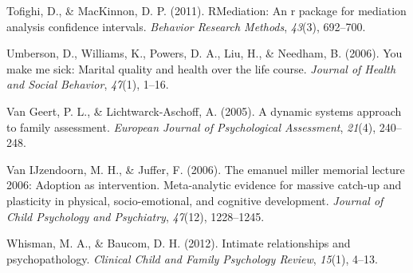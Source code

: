 \documentclass[man]{apa6}
\begin{document}
\leavevmode\hypertarget{ref-monte}{}%
Tofighi, D., \& MacKinnon, D. P. (2011). RMediation: An r package for mediation analysis confidence intervals. \emph{Behavior Research Methods}, \emph{43}(3), 692--700.

\leavevmode\hypertarget{ref-umberson2006you}{}%
Umberson, D., Williams, K., Powers, D. A., Liu, H., \& Needham, B. (2006). You make me sick: Marital quality and health over the life course. \emph{Journal of Health and Social Behavior}, \emph{47}(1), 1--16.

\leavevmode\hypertarget{ref-van2005dynamic}{}%
Van Geert, P. L., \& Lichtwarck-Aschoff, A. (2005). A dynamic systems approach to family assessment. \emph{European Journal of Psychological Assessment}, \emph{21}(4), 240--248.

\leavevmode\hypertarget{ref-van2006emanuel}{}%
Van IJzendoorn, M. H., \& Juffer, F. (2006). The emanuel miller memorial lecture 2006: Adoption as intervention. Meta-analytic evidence for massive catch-up and plasticity in physical, socio-emotional, and cognitive development. \emph{Journal of Child Psychology and Psychiatry}, \emph{47}(12), 1228--1245.

\leavevmode\hypertarget{ref-whisman2012intimate}{}%
Whisman, M. A., \& Baucom, D. H. (2012). Intimate relationships and psychopathology. \emph{Clinical Child and Family Psychology Review}, \emph{15}(1), 4--13.

\endgroup
\end{document}
